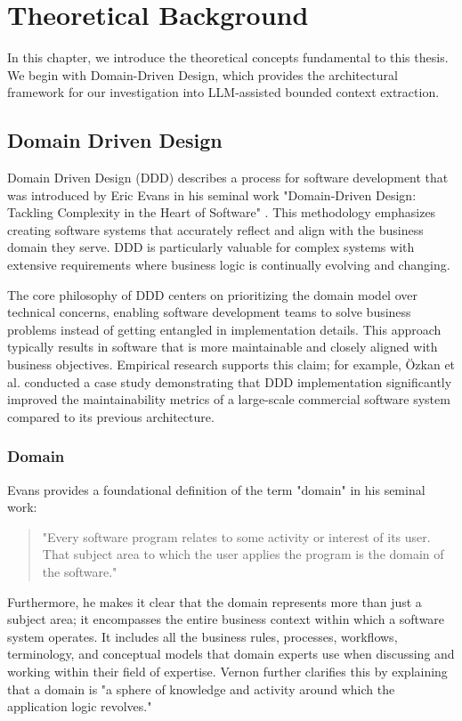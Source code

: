 \chapter{Theoretical Background}\label{chapter:theoreticalbg}
In this chapter, we introduce the theoretical concepts fundamental to this thesis. We begin with Domain-Driven Design, which provides the architectural framework for our investigation into LLM-assisted bounded context extraction.

\section{Domain Driven Design}\label{sec:ddd}
Domain Driven Design (DDD) describes a process for software development that was introduced by Eric Evans in his seminal work "Domain-Driven Design: Tackling Complexity in the Heart of Software" \autocite{evans2004domain}. This methodology emphasizes creating software systems that accurately reflect and align with the business domain they serve. DDD is particularly valuable for complex systems with extensive requirements where business logic is continually evolving and changing.

The core philosophy of DDD centers on prioritizing the domain model over technical concerns, enabling software development teams to solve business problems instead of getting entangled in implementation details. This approach typically results in software that is more maintainable and closely aligned with business objectives. Empirical research supports this claim; for example, Özkan et al. \autocite{ddd-maintainability} conducted a case study demonstrating that DDD implementation significantly improved the maintainability metrics of a large-scale commercial software system compared to its previous architecture.

\subsection{Domain}
Evans provides a foundational definition of the term "domain" in his seminal work:
\begin{quote}
"Every software program relates to some activity or interest of its user. That subject area to which the user applies the program is the domain of the software."
\autocite[p.~4]{evans2004domain}
\end{quote}
Furthermore, he makes it clear that the domain represents more than just a subject area; it encompasses the entire business context within which a software system operates. It includes all the business rules, processes, workflows, terminology, and conceptual models that domain experts use when discussing and working within their field of expertise. Vernon \autocite[p.~17]{vernon2013implementing} further clarifies this by explaining that a domain is "a sphere of knowledge and activity around which the application logic revolves."

